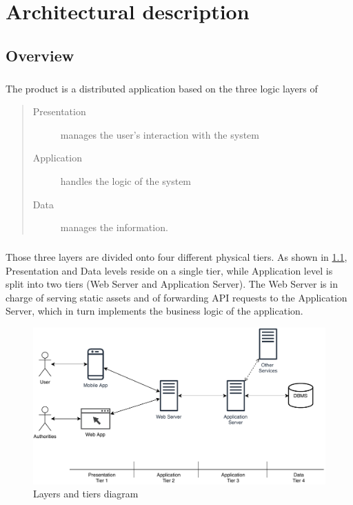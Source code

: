 

	\chapter{Architectural description}
		\section{Overview}
			\paragraph{}
				The product is a distributed application based on the three logic layers of
				\begin{quote}
					\begin{description}
						\item[Presentation] manages the user's interaction with the system
						\item[Application] handles the logic of the system
						\item[Data] manages the information.
					\end{description}
				\end{quote}				 
			\paragraph{}
				Those three layers are divided onto four different physical tiers. As shown in \ref{fig:tiers}, Presentation and Data levels reside on a single tier, while Application level is split into two tiers (Web Server and Application Server). The Web Server is in charge of serving static assets and of forwarding API requests to the Application Server, which in turn implements the business logic of the application.
				\begin{figure}[!h]
					\centering
					\includegraphics[width=\textwidth]{images/DD2/SimplifiedDeploymentView.pdf}
					\caption{Layers and tiers diagram}
					\label{fig:tiers}
				\end{figure}
